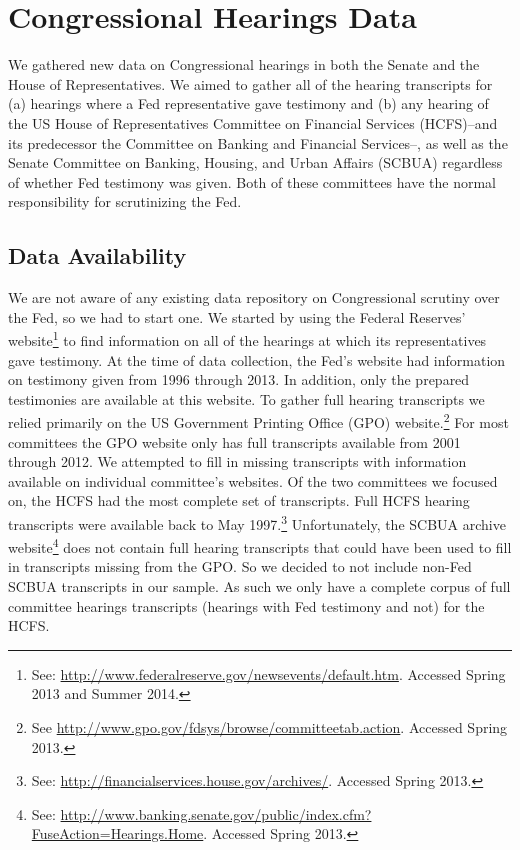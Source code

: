 \documentclass[a4paper]{article}\usepackage[]{graphicx}\usepackage[]{color}
\begin{document}
\section{Congressional Hearings Data}

We gathered new data on Congressional hearings in both the Senate and the House of Representatives. We aimed to gather all of the hearing transcripts for (a) hearings where a Fed representative gave testimony and (b) any hearing of the US House of Representatives Committee on Financial Services (HCFS)--and its predecessor the Committee on Banking and Financial Services--, as well as the Senate Committee on Banking, Housing, and Urban Affairs (SCBUA) regardless of whether Fed testimony was given. Both of these committees have the normal responsibility for scrutinizing the Fed.

\subsection{Data Availability}

We are not aware of any existing data repository on Congressional scrutiny over the Fed, so we had to start one. We started by using the Federal Reserves' website\footnote{See: \url{http://www.federalreserve.gov/newsevents/default.htm}. Accessed Spring 2013 and Summer 2014.} to find information on all of the hearings at which its representatives gave testimony. At the time of data collection, the Fed's website had information on testimony given from 1996 through 2013. In addition, only the prepared testimonies are available at this website. To gather full hearing transcripts we relied primarily on the US Government Printing Office (GPO) website.\footnote{See \url{http://www.gpo.gov/fdsys/browse/committeetab.action}. Accessed Spring 2013.} For most committees the GPO website only has full transcripts available from 2001 through 2012. We attempted to fill in missing transcripts with information available on individual committee's websites. Of the two committees we focused on, the HCFS had the most complete set of transcripts. Full HCFS hearing transcripts were available back to May 1997.\footnote{See: \url{http://financialservices.house.gov/archives/}. Accessed Spring 2013.} Unfortunately, the SCBUA archive website\footnote{See: \url{http://www.banking.senate.gov/public/index.cfm?FuseAction=Hearings.Home}. Accessed Spring 2013.} does not contain full hearing transcripts that could have been used to fill in transcripts missing from the GPO. So we decided to not include non-Fed SCBUA transcripts in our sample. As such we only have a complete corpus of full committee hearings transcripts (hearings with Fed testimony and not) for the HCFS.
\end{document}
